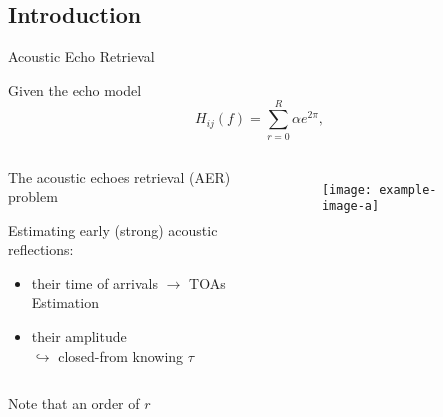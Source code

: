 \subsection{Introduction}

\begin{frame}{Acoustic Echo Retrieval}

    Given the echo model
    \begin{equation*}
        H_{ij}(f) = \sum_{r=0}^{R} \alpha e^{2\pi},
    \end{equation*}

    \vfill

    \begin{columns}[T,onlytextwidth]

        \begin{alertblock}{The acoustic echoes retrieval (AER) problem}

        \vspace{.2em}

        Estimating early (strong) acoustic reflections:
        \begin{itemize}
            \item their time of arrivals $\rightarrow$ TOAs Estimation
            \item their amplitude
            \\\hspace{1em}$\hookrightarrow$ closed-from knowing $\tau$~\cite{Condat}
        \end{itemize}

        \end{alertblock}

        \begin{figure}
            \centering
            \texttt{[image: example-image-a]}
        \end{figure}{}

    \end{columns}

    \vfill

    Note that an order of $r$


\end{frame}

